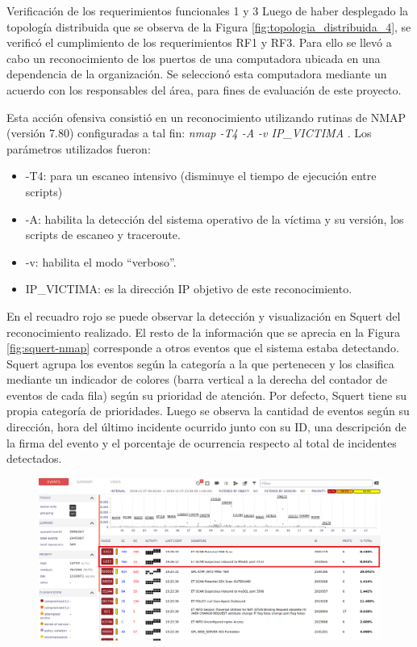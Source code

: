     \begin{section}{Verificación de los requerimientos funcionales 1 y 3}
    Luego de haber desplegado la topología distribuida que se observa de la Figura \ref{fig:topologia_distribuida_4}, se verificó el cumplimiento de los requerimientos RF1 y RF3. Para ello se llevó a cabo un reconocimiento de los puertos de una computadora ubicada en una dependencia de la organización. Se seleccionó esta computadora mediante un acuerdo con los responsables del área, para fines de evaluación de este proyecto. \par
    Esta acción ofensiva consistió en un reconocimiento utilizando rutinas de NMAP \cite{nmap} (versión 7.80) configuradas a tal fin: \textit{nmap -T4 -A -v IP\_VICTIMA} . Los parámetros utilizados fueron:
    \begin{itemize}
        \item -T4: para un escaneo intensivo (disminuye el tiempo de ejecución entre scripts)
        \item -A: habilita la detección del sistema operativo de la víctima y su versión, los scripts de escaneo y traceroute.
        \item -v: habilita el modo “verboso”.
        \item IP\_VICTIMA: es la dirección IP objetivo de este reconocimiento.
    \end{itemize}
    En el recuadro rojo se puede observar la detección y visualización en Squert del reconocimiento realizado. El resto de la información que se aprecia en la Figura \ref{fig:squert-nmap} corresponde a otros eventos que el sistema estaba detectando. Squert agrupa los eventos según la categoría a la que pertenecen y los clasifica mediante un indicador de colores (barra vertical a la derecha del contador de eventos de cada fila) según su prioridad de atención. Por defecto, Squert tiene su propia categoría de prioridades. Luego se observa la cantidad de eventos según su dirección, hora del último incidente ocurrido junto con su ID, una descripción de la firma del evento y el porcentaje de ocurrencia respecto al total de incidentes detectados.
    \begin{figure}[H]
        \centering
        \includegraphics[width=1\textwidth]{./iteracion_1_imagenes/Squert_NMAP.png}

\end{figure}
\end{section}
